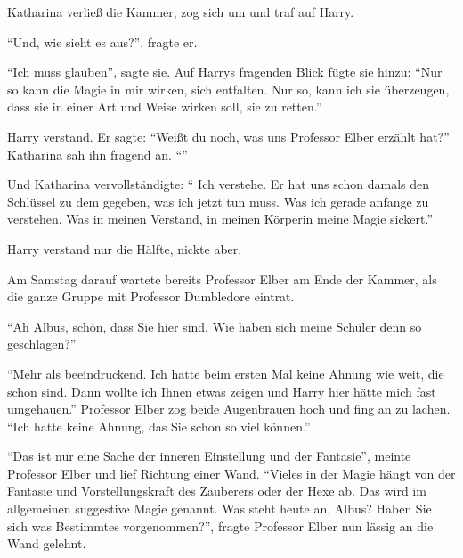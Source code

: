 Katharina verließ die Kammer, zog sich um und traf auf Harry.

\enquote{Und, wie sieht es aus?}, fragte er.

\enquote{Ich muss glauben}, sagte sie. Auf Harrys fragenden Blick fügte sie hinzu: \enquote{Nur so kann die Magie in mir wirken, sich entfalten. Nur so, kann ich sie überzeugen, dass sie in einer Art und Weise wirken soll, sie zu retten.}

Harry verstand. Er sagte: \enquote{Weißt du noch, was uns Professor Elber erzählt hat?} Katharina sah ihn fragend an. \enquote{}

Und Katharina vervollständigte: \enquote{ \gst Ich verstehe. Er hat uns schon damals den Schlüssel zu dem gegeben, was ich jetzt tun muss. Was ich gerade anfange zu verstehen. Was in meinen Verstand, in meinen Körper\abs in meine Magie sickert.}

Harry verstand nur die Hälfte, nickte aber.


\trenn

Am Samstag darauf wartete bereits Professor Elber am Ende der Kammer, als die ganze Gruppe mit Professor Dumbledore eintrat.

\enquote{Ah Albus, schön, dass Sie hier sind. Wie haben sich meine Schüler denn so geschlagen?}

\enquote{Mehr als beeindruckend. Ich hatte beim ersten Mal keine Ahnung wie weit, die schon sind. Dann wollte ich Ihnen etwas zeigen und Harry hier hätte mich fast umgehauen.} Professor Elber zog beide Augenbrauen hoch und fing an zu lachen. \enquote{Ich hatte keine Ahnung, das Sie schon so viel können.}

\enquote{Das ist nur eine Sache der inneren Einstellung und der Fantasie}, meinte Professor Elber und lief Richtung einer Wand. \enquote{Vieles in der Magie hängt von der Fantasie und Vorstellungskraft des Zauberers oder der Hexe ab. Das wird im allgemeinen suggestive Magie genannt. Was steht heute an, Albus? Haben Sie sich was Bestimmtes vorgenommen?}, fragte Professor Elber nun lässig an die Wand gelehnt.

